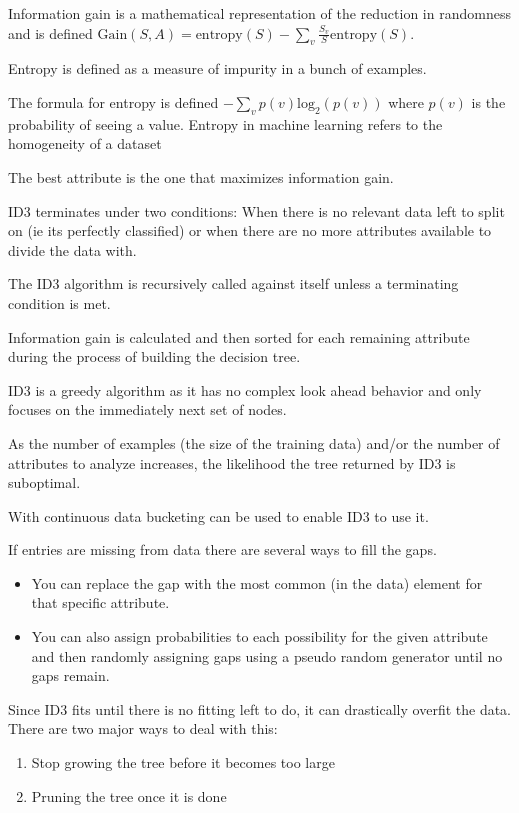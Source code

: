 \documentclass{article}
\begin{document}
Information gain is a mathematical representation of the reduction in randomness
and is defined
$\text{Gain} (S,A) = \text{entropy}(S) - \sum_v \frac{S_v}{S}\text{entropy}(S)$.

Entropy is defined as a measure of impurity in a bunch of examples. 

The formula for entropy is defined $-\sum_v p(v)\text{log}_2(p(v))$ where $p(v)$
is the probability of seeing a value. Entropy in machine learning refers to 
the homogeneity of a dataset

The best attribute is the one that maximizes information gain.  

ID3 terminates under two conditions: When there is no relevant data left to
split on (ie its perfectly classified) or when there are no more attributes 
available to divide the data with. 

The ID3 algorithm is recursively called against itself unless a terminating
condition is met. 

Information gain is calculated and then sorted for each remaining attribute 
during the process of building the decision tree. 

ID3 is a greedy algorithm as it has no complex look ahead behavior and only
focuses on the immediately next set of nodes. 

As the number of examples (the size of the training data) and/or the number of 
attributes to analyze increases, the likelihood the tree returned by ID3 is 
suboptimal.

With continuous data bucketing can be used to enable ID3 to use it. 

If entries are missing from data there are several ways to fill the gaps. 

\begin{itemize}
	\item You can replace the gap with the most common (in the data) element
		for that specific attribute. 
	\item You can also assign probabilities to each possibility for the
		given attribute and then randomly assigning gaps using a 
		pseudo random generator until no gaps remain. 
\end{itemize}

Since ID3 fits until there is no fitting left to do, it can drastically overfit
the data. There are two major ways to deal with this:

\begin{enumerate}
	\item Stop growing the tree before it becomes too large
	\item Pruning the tree once it is done
\end{enumerate}
\end{document}
